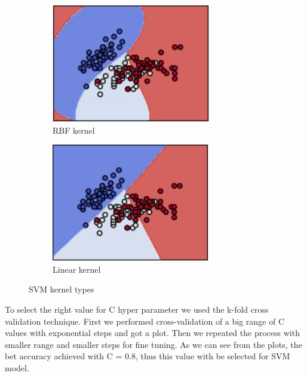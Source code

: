 \documentclass[12pt]{article}
\begin{document}
\begin{figure}[h]
\centering
\begin{subfigure}{.4\textwidth}
  \centering
  \includegraphics[width=.7\linewidth]{report_pics/SVM_RBF}
  \caption{RBF kernel}
  \label{fig:sub1}
\end{subfigure}%
\begin{subfigure}{.4\textwidth}
  \centering
  \includegraphics[width=.7\linewidth]{report_pics/SVM_linear}
  \caption{Linear kernel}
  \label{fig:sub2}
\end{subfigure}
\caption{SVM kernel types}
\label{fig:test}
\end{figure}

To select the right value for C hyper parameter we used the k-fold cross validation technique. First we performed cross-validation of a big range of C values with exponential steps and got a plot. Then we repeated the process with smaller range and smaller steps for fine tuning. As we can see from the plots, the bet accuracy achieved with C = 0.8, thus this value with be selected for SVM model.
\end{document}

